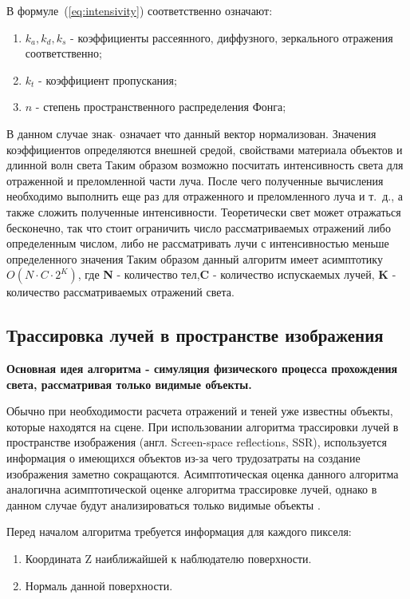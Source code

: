 В формуле~(\ref{eq:intensivity}) соответственно означают:
\begin{enumerate}
	\item $k_a,k_d,k_s$ - коэффициенты рассеянного, диффузного, зеркального отражения соответственно;
	\item $k_t$ - коэффициент пропускания;
	\item $n$ - степень пространственного распределения Фонга;
\end{enumerate}
В данном случае знак $ \hat{} $  означает что данный вектор нормализован.
Значения коэффициентов определяются внешней средой, свойствами материала объектов и длинной волн света
Таким образом возможно посчитать интенсивность света для отраженной и преломленной части луча.
После чего полученные вычисления необходимо выполнить еще раз для отраженного и преломленного луча и т.~д., а также сложить полученные интенсивности.
Теоретически свет может отражаться бесконечно, так что стоит ограничить число рассматриваемых отражений либо определенным числом,
либо не рассматривать лучи с интенсивностью меньше определенного значения
Таким образом данный алгоритм имеет асимптотику $O(N \cdot C \cdot 2^{K})$, где \textbf{N} - количество тел,\textbf{C} - количество испускаемых лучей,
\textbf{K} - количество рассматриваемых отражений света. \cite{Rodgers}





\subsection{Трассировка лучей в пространстве изображения}
\textbf{Основная идея алгоритма - симуляция физического процесса прохождения света, рассматривая только видимые объекты.} \par
Обычно при необходимости расчета отражений и теней уже известны объекты, которые находятся на сцене. При использовании алгоритма трассировки лучей в пространстве изображения (англ. Screen-space reflections, SSR), используется информация о имеющихся
объектов из-за чего трудозатраты на создание изображения заметно сокращаются.
Асимптотическая оценка данного алгоритма аналогична асимптотической оценке алгоритма трассировке лучей, однако в данном случае будут анализироваться только видимые объекты \cite{SSR}.

Перед началом алгоритма требуется информация для каждого пикселя:
\begin{enumerate}
	\item Координата Z наиближайшей к наблюдателю поверхности.
	\item Нормаль данной поверхности.
\end{enumerate}



